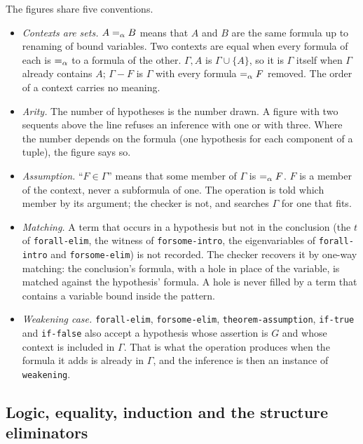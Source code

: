 The figures share five conventions.
\begin{itemize}
\item \emph{Contexts are sets.}  $A =_{\alpha} B$ means that $A$ and $B$ are
  the same formula up to renaming of bound variables.  Two contexts are
  equal when every formula of each is $=_{\alpha}$ to a formula of the other.
  $\Gamma, A$ is $\Gamma \cup \{A\}$, so it is $\Gamma$ itself when
  $\Gamma$ already contains $A$; $\Gamma - F$ is $\Gamma$ with every
  formula $=_{\alpha} F$ removed.  The order of a context carries no meaning.
\item \emph{Arity.}  The number of hypotheses is the number drawn.  A
  figure with two sequents above the line refuses an inference with one
  or with three.  Where the number depends on the formula (one hypothesis
  for each component of a tuple), the figure says so.
\item \emph{Assumption.}  ``$F \in \Gamma$'' means that some member of
  $\Gamma$ is $=_{\alpha} F$.  $F$ is a member of the context, never a
  subformula of one.  The operation is told which member by its argument;
  the checker is not, and searches $\Gamma$ for one that fits.
\item \emph{Matching.}  A term that occurs in a hypothesis but not in the
  conclusion (the $t$ of \texttt{forall-elim}, the witness of
  \texttt{forsome-intro}, the eigenvariables of \texttt{forall-intro}
  and \texttt{forsome-elim}) is not recorded.  The checker recovers it by
  one-way matching: the conclusion's formula, with a hole in place of the
  variable, is matched against the hypothesis' formula.  A hole is never
  filled by a term that contains a variable bound inside the pattern.
\item \emph{Weakening case.}  \texttt{forall-elim}, \texttt{forsome-elim},
  \texttt{theorem-assumption}, \texttt{if-true} and \texttt{if-false}
  also accept a hypothesis whose assertion is $G$ and whose context is
  included in $\Gamma$.  That is what the operation produces when the
  formula it adds is already in $\Gamma$, and the inference is then an
  instance of \texttt{weakening}.
\end{itemize}

\subsection{Logic, equality, induction and the structure eliminators}

